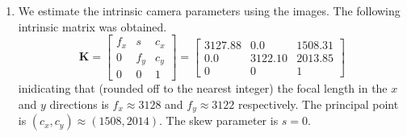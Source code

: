 \documentclass[10pt]{article}
\begin{document}
    \begin{enumerate}
        \item We estimate the intrinsic camera parameters using the images. The following
        intrinsic matrix was obtained.
        \begin{equation*}
            \mathbf{K} = \begin{bmatrix}
                f_{x} & s & c_{x} \\
                0 & f_{y} & c_{y} \\
                0 & 0 & 1
            \end{bmatrix} = \begin{bmatrix}
                3127.88 & 0.0 & 1508.31 \\
                0.0 & 3122.10 & 2013.85 \\
                0 & 0 & 1
            \end{bmatrix}
        \end{equation*}
        inidicating that (rounded off to the nearest integer) the focal length in the
        $x$ and $y$ directions is $f_{x} \approx 3128$ and $f_{y} \approx 3122$  respectively.
        The principal point is $(c_{x}, c_{y}) \approx (1508, 2014)$. The skew parameter is
        $s = 0$.


\end{enumerate}
\end{document}
